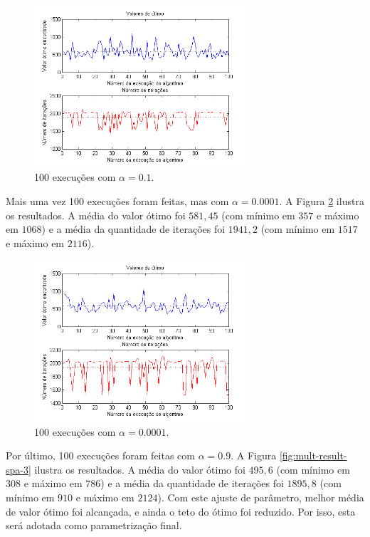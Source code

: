 \documentclass[conference]{IEEEtran}
\begin{document}
	\begin{figure}[h]
		\centering
		\includegraphics[width=8cm]{img/mult-result-spa-1.png}
		\caption{100 execuções com $\alpha = 0.1$.}
		\label{fig:mult-result-spa-1}
	\end{figure}
	\newpage
Mais uma vez 100 execuções foram feitas, mas com $\alpha = 0.0001$. A Figura \ref{fig:mult-result-spa-2} ilustra os resultados. A média do valor ótimo foi $581,45$ (com mínimo em $357$ e máximo em $1068$) e a média da quantidade de iterações foi $1941,2$ (com mínimo em $1517$ e máximo em $2116$).

	\begin{figure}[h]
		\centering
		\includegraphics[width=8cm]{img/mult-result-spa-2.png}
		\caption{100 execuções com $\alpha = 0.0001$.}
		\label{fig:mult-result-spa-2}
	\end{figure}
	
Por último, 100 execuções foram feitas com $\alpha = 0.9$. A Figura \ref{fig:mult-result-spa-3} ilustra os resultados. A média do valor ótimo foi $495,6$ (com mínimo em $308$ e máximo em $786$) e a média da quantidade de iterações foi $1895,8$ (com mínimo em $910$ e máximo em $2124$). Com este ajuste de parâmetro, melhor média de valor ótimo foi alcançada, e ainda o teto do ótimo foi reduzido. Por isso, esta será adotada como parametrização final.
	
\end{document}
